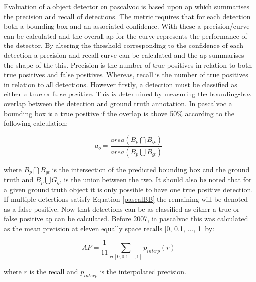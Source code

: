 Evaluation of a object detector on \gls{pascalvoc} is based upon \gls{ap} which summarises the precision and recall of detections. The metric requires that for each detection both a bounding-box and an associated confidence. With these a precision/curve can be calculated and the overall \gls{ap} for the curve represents the performance of the detector. By altering the threshold corresponding to the confidence of each detection a precision and recall curve can be calculated and the \gls{ap} summarises the shape of the this. Precision is the number of true positives in relation to both true positives and false positives. Whereas, recall is the number of true positives in relation to all detections. However firstly, a detection must be classified as either a true or false positive. This is determined by measuring the bounding-box overlap between the detection and ground truth annotation. In \gls{pascalvoc} a bounding box is a true positive if the overlap is above 50\% according to the following calculation:

\begin{equation}\label{pascalBB}
	a_o = \frac{area(B_p \bigcap B_{gt})}{area(B_p \bigcup B_{gt})}
\end{equation}
 
where $B_p \bigcap B_{gt}$ is the intersection of the predicted bounding box and the ground truth and $B_p \bigcup G_{gt}$ is the union between the two. It should also be noted that for a given ground truth object it is only possible to have one true positive detection. If multiple detections satisfy Equation \ref{pascalBB} the remaining will be denoted as a false positive. Now that detections can be as classified as either a true or false positive \gls{ap} can be calculated. Before 2007, in \gls{pascalvoc} this was calculated as the mean precision at eleven equally space recalls [0, 0.1, ..., 1] by:

\begin{equation}
	AP = \frac{1}{11} \sum_{r\epsilon[0, 0.1, ..., 1]}p_{interp}(r)  
\end{equation}

where $r$ is the recall and $p_{interp}$ is the interpolated precision.

